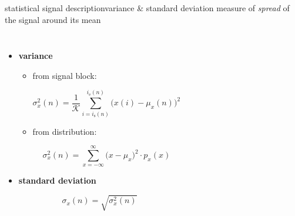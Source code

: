 \begin{frame}{statistical signal description}{variance \& standard deviation}
    \vspace{-2mm}
    measure of \textit{spread} of the signal around its mean
    \vspace{-5mm}
    \begin{columns}
    \begin{itemize}
        \item \textbf{variance}
            \begin{itemize}
                \item   from signal block:
                \vspace{-2mm}
                    \begin{footnotesize}
                    \begin{equation*}
                        \sigma_x^2(n) = \frac{1}{\mathcal{K}}\sum\limits_{i= i_{\mathrm{s}}(n)}^{i_{\mathrm{e}}(n)}{\big(x(i)-\mu_x(n)\big)^2} 
                    \end{equation*}
                     \end{footnotesize}
                \pause
                \item   from distribution:
                \vspace{-2mm}
                     \begin{footnotesize}
                    \begin{equation*}
                        \sigma_x^2(n) = \sum\limits_{x=-\infty}^{\infty}{\big(x-\mu_x\big)^2\cdot p_x(x)} 
                    \end{equation*}
                     \end{footnotesize}
            \end{itemize}
        \pause
        \bigskip
        \item \textbf{standard deviation}
                \vspace{-2mm}
                 \begin{footnotesize}
            \begin{equation*}
                \sigma_x(n) = \sqrt{\sigma_x^2(n)} 
            \end{equation*}
             \end{footnotesize}
    \end{itemize}
        
    \end{columns}
\end{frame}


